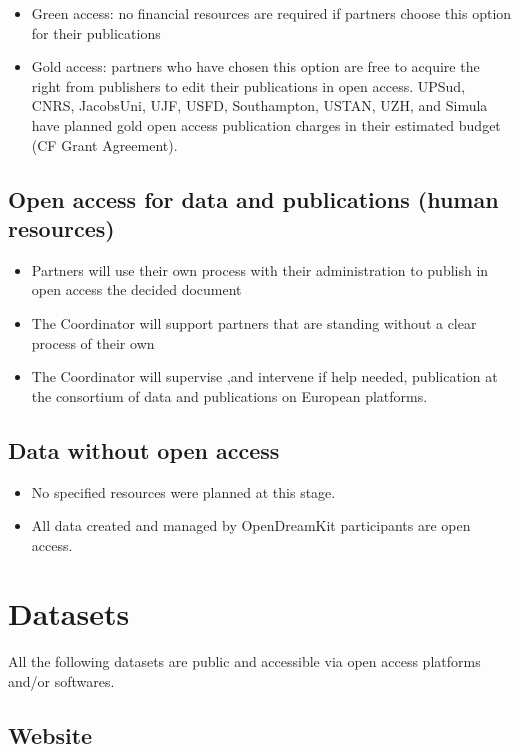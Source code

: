 \documentclass{deliverablereport}
\begin{document}
\begin{itemize}
\item{}Green access: no financial resources are required if partners choose this option for their publications
\item{}Gold access: partners who have chosen this option are free to acquire the right from publishers to edit their publications in open access.
UPSud, CNRS, JacobsUni, UJF, USFD, Southampton, USTAN, UZH, and Simula have planned gold open access publication charges in their estimated budget (CF Grant Agreement).
\end{itemize}

\subsection{Open access for data and publications (human resources)}


\begin{itemize}
\item{}Partners will use their own process with their administration to publish in open access the decided document
\item{}The Coordinator will support partners that are standing without a clear process of their own
\item{}The Coordinator will supervise ,and intervene if help needed, publication at the consortium of data and publications on European platforms.
\end{itemize}


\subsection{Data without open access}
\begin{itemize}
\item{}No specified resources were planned at this stage.
\item{}All data created and managed by OpenDreamKit participants are open access.
\end{itemize}
\newpage
\section{Datasets}
All the following datasets are public and accessible via open access platforms and/or softwares.


\subsection{Website}
\end{document}
